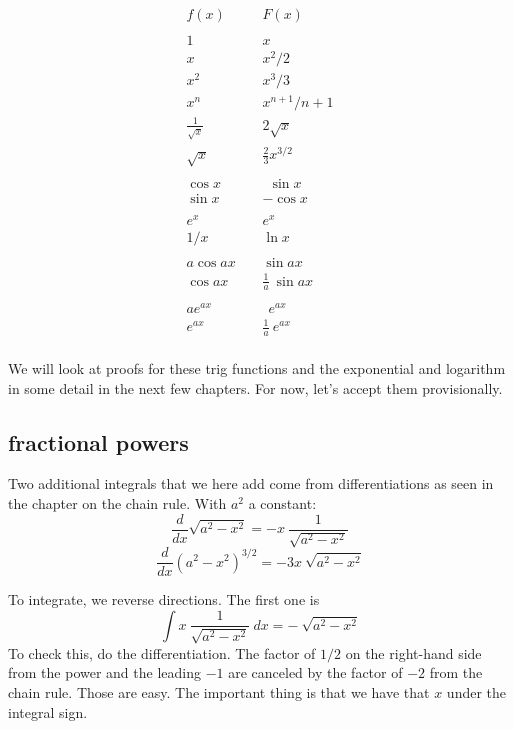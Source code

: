\documentclass[11pt, oneside]{article}
\begin{document}
\[ \begin{matrix} f(x) \ \ \ \ \ & F(x) \\
& \\
1 \ \ \ \ \ & x \\
x \ \ \ \ \ & x^2/2 \\
x^2 \ \ \ \ \ & x^3/3 \\
x^n \ \ \ \ \ & x^{n+1}/n+1 \\
\frac{1}{\sqrt{x}}  \ \ \ \ \ & 2 \sqrt{x} \\
\sqrt{x}   \ \ \ \ \ & \frac{2}{3} x^{3/2}  \\
& \\
\cos x  \ \ \ \ \ & \ \ \sin x \\
\sin x  \ \ \ \ \ & - \cos x \\
& \\
e^{x} \ \ \ \ \ & e^{x} \\
1/x \ \ \ \ \ & \ln x \\
& \\
a \cos ax \ \ \ \ \ & \sin ax \\
\cos ax \ \ \ \ \ & \frac{1}{a} \ \sin ax \\
& \\
ae^{ax}  \ \ \ \ \ & \ \ e^{ax} \\
e^{ax}   \ \ \ \ \ & \frac{1}{a} \ e^{ax} \\
\end{matrix} \]

We will look at proofs for these trig functions and the exponential and logarithm in some detail in the next few chapters.  For now, let's accept them provisionally.

\subsection*{fractional powers}

Two additional integrals that we here add come from differentiations as seen in the chapter on the chain rule.  With $a^2$ a constant:
\[ \frac{d}{dx} \sqrt{a^2 - x^2} =  - x \ \frac{1}{\sqrt{a^2 - x^2}} \]
\[ \frac{d}{dx} (a^2 - x^2)^{3/2} = -3x \ \sqrt{a^2 - x^2} \]

To integrate, we reverse directions.  The first one is
\[ \int x \ \frac{1}{\sqrt{a^2 - x^2}} \ dx = - \ \sqrt{a^2 - x^2} \]
To check this, do the differentiation.  The factor of $1/2$ on the right-hand side from the power and the leading $-1$ are canceled by the factor of $-2$ from the chain rule.  Those are easy.  The important thing is that we have that $x$ under the integral sign.
\end{document}
